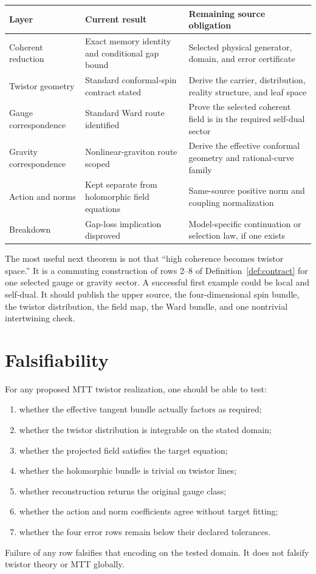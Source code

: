 \documentclass[11pt]{article}
\begin{document}
\begin{center}
\begin{tabular}{>{\raggedright\arraybackslash}p{}
                >{\raggedright\arraybackslash}p{}
                >{\raggedright\arraybackslash}p{}}
\toprule
Layer & Current result & Remaining source obligation\\
\midrule
Coherent reduction
& Exact memory identity and conditional gap bound
& Selected physical generator, domain, and error certificate\\
Twistor geometry
& Standard conformal-spin contract stated
& Derive the carrier, distribution, reality structure, and leaf space\\
Gauge correspondence
& Standard Ward route identified
& Prove the selected coherent field is in the required self-dual sector\\
Gravity correspondence
& Nonlinear-graviton route scoped
& Derive the effective conformal geometry and rational-curve family\\
Action and norms
& Kept separate from holomorphic field equations
& Same-source positive norm and coupling normalization\\
Breakdown
& Gap-loss implication disproved
& Model-specific continuation or selection law, if one exists\\
\bottomrule
\end{tabular}
\end{center}

The most useful next theorem is not that ``high coherence becomes twistor
space.'' It is a commuting construction of rows 2--8 of
Definition~\ref{def:contract} for one selected gauge or gravity sector. A
successful first example could be local and self-dual. It should publish the
upper source, the four-dimensional spin bundle, the twistor distribution,
the field map, the Ward bundle, and one nontrivial intertwining check.

\section{Falsifiability}

For any proposed MTT twistor realization, one should be able to test:
\begin{enumerate}
\item whether the effective tangent bundle actually factors as required;
\item whether the twistor distribution is integrable on the stated domain;
\item whether the projected field satisfies the target equation;
\item whether the holomorphic bundle is trivial on twistor lines;
\item whether reconstruction returns the original gauge class;
\item whether the action and norm coefficients agree without target fitting;
\item whether the four error rows remain below their declared tolerances.
\end{enumerate}
Failure of any row falsifies that encoding on the tested domain. It does not
falsify twistor theory or MTT globally.
\end{document}
